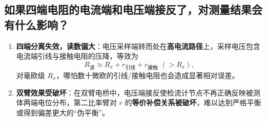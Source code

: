 \documentclass[]{../../templates/Report}%
\begin{document}
\begin{fullreportonly}
\subsection{如果四端电阻的电流端和电压端接反了，对测量结果会有什么影响？}
\begin{enumerate}[label=(\arabic*)]
    \item \textbf{四端分离失效，读数偏大}：电压采样端转而处在\textbf{高电流路径}上，采样电压包含电流端引线与接触电阻的压降，等效为
    \begin{equation}
        R_{\text{读}} \approx R_x + r_{\text{引线}} + r_{\text{接触}} \,\, (> R_x),
    \end{equation}
    对毫欧级 $R_x$，哪怕数十微欧的引线/接触电阻也会造成显著相对误差。
    \item \textbf{双臂效果受破坏}：在双臂电桥中，电压端接反使检流计节点不再正确反映被测体两端电位分布，第二比率臂对 $r$ 的\textbf{等价补偿关系被破坏}，难以达到严格平衡或得到偏差更大的“伪平衡”。
\end{enumerate}
\end{fullreportonly}
\insertnotes
\end{document}
